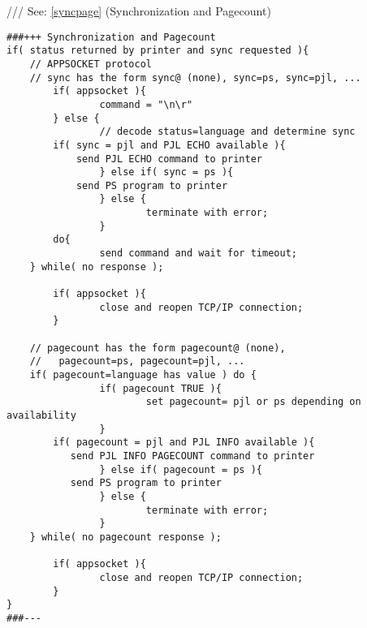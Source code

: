 \documentclass[a4paper]{article}
\begin{document}
{\ttfamily ///} See: \ref{syncpage} {(Synchronization and Pagecount)}
\begin{tscreen}
\begin{verbatim}
###+++ Synchronization and Pagecount
if( status returned by printer and sync requested ){
    // APPSOCKET protocol
    // sync has the form sync@ (none), sync=ps, sync=pjl, ...
        if( appsocket ){
                command = "\n\r"
        } else {
                // decode status=language and determine sync
        if( sync = pjl and PJL ECHO available ){
            send PJL ECHO command to printer
                } else if( sync = ps ){
            send PS program to printer
                } else {
                        terminate with error;
                }
        do{
                send command and wait for timeout;
    } while( no response );

        if( appsocket ){
                close and reopen TCP/IP connection;
        }

    // pagecount has the form pagecount@ (none),
    //   pagecount=ps, pagecount=pjl, ...
    if( pagecount=language has value ) do {
                if( pagecount TRUE ){
                        set pagecount= pjl or ps depending on availability
                }
        if( pagecount = pjl and PJL INFO available ){
           send PJL INFO PAGECOUNT command to printer
                } else if( pagecount = ps ){
           send PS program to printer
                } else {
                        terminate with error;
                }
    } while( no pagecount response );

        if( appsocket ){
                close and reopen TCP/IP connection;
        }
}
###---
\end{verbatim}
\end{tscreen}
\end{document}
